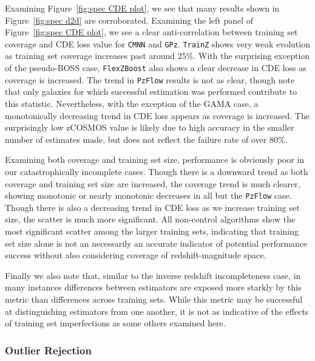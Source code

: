 \documentclass[fleqn,usenatbib,useAMS]{mnras}
\newcommand{\PersonalTag}[3]{{\color{#2}{$^{#1}$ [#3}]}}
\newcommand{\rachel}[1]{\PersonalTag{Rachel}{orange}{#1}}
\begin{document}
Examining Figure~\ref{fig:spec CDE plot}, we see that many results shown in Figure~\ref{fig:spec d2d} are corroborated. 
Examining the left panel of Figure~\ref{fig:spec CDE plot}, we see a clear anti-correlation between training set coverage and CDE loss value for \texttt{CMNN} and \texttt{GPz}. \texttt{TrainZ} shows very weak evolution as training set coverage increases past around $25\%$. With the surprising exception of the pseudo-BOSS case, \texttt{FlexZBoost} also shows a clear decrease in CDE loss as coverage is increased. The trend in \texttt{PzFlow} results is not as clear, though note that only galaxies for which successful estimation was performed contribute to this statistic. Nevertheless, with the exception of the GAMA case, a monotonically decreasing trend in CDE loss appears as coverage is increased. The surprisingly low zCOSMOS value is likely due to high accuracy in the smaller number of estimates made, but does not reflect the failure rate of over $80\%$. 

Examining both coverage and training set size, performance is obviously poor in our catastrophically incomplete cases. Though there is a downward trend as both coverage and training set size are increased, the coverage trend is much clearer, showing monotonic or nearly monotonic decreases in all but the \texttt{PzFlow} case. Though there is also a decreasing trend in CDE loss as we increase training set size, the scatter is much more significant. 
All non-control algorithms show the most significant scatter among the larger training sets, indicating that training set size alone is not an necessarily an accurate indicator of potential performance success without also considering coverage of redshift-magnitude space.

Finally we also note that, similar to the inverse redshift incompleteness case, in many instances differences between estimators are exposed more starkly by this metric than differences across training sets. While this metric may be successful at distinguishing estimators from one another, it is not as indicative of the effects of training set imperfections as some others examined here. 

\subsubsection{Outlier Rejection}
\end{document}
